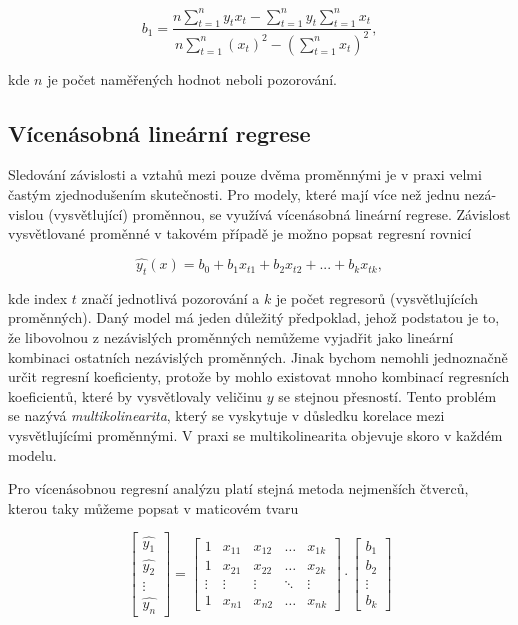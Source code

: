 \documentclass[a4paper,12pt,twoside]{scrreprt}
\begin{document}
\begin{equation}
b_1 = \frac{n\sum_{t=1}^{n}y_tx_t - \sum_{t=1}^{n}y_t\sum_{t=1}^{n}x_t} {n\sum_{t=1}^{n}(x_t)^2 - (\sum_{t=1}^{n}x_t)^2},
\end{equation}

kde $n$ je počet naměřených hodnot neboli pozorování. 

\subsection{Vícenásobná lineární regrese}

Sledování závislosti a vztahů mezi pouze dvěma proměnnými je v praxi velmi častým zjednodušením skutečnosti. Pro modely, které mají více než jednu nezá-vislou (vysvětlující) proměnnou, se využívá vícenásobná lineární regrese. Závislost vysvětlované proměnné v takovém případě je možno popsat regresní rovnicí 

\begin{equation}
\hat{y_t}(x) = b_0 + b_1x_{t1} + b_2x_{t2} + ... + b_kx_{tk},
\end{equation}

kde index $t$ značí jednotlivá pozorování a $k$ je počet regresorů (vysvětlujících proměnných). Daný model má jeden důležitý předpoklad, jehož podstatou je to, že libovolnou z nezávislých proměnných nemůžeme vyjadřit jako lineární kombinaci ostatních nezávislých proměnných. Jinak bychom nemohli jednoznačně určit regresní koeficienty, protože by mohlo existovat mnoho kombinací regresních koeficientů, které by vysvětlovaly veličinu $y$ se stejnou přesností. Tento problém se nazývá \textit{multikolinearita}, který se vyskytuje v důsledku korelace mezi vysvětlujícími proměnnými. V praxi se multikolinearita objevuje skoro v každém modelu.

Pro vícenásobnou regresní analýzu platí stejná metoda nejmenších čtverců, kterou taky můžeme popsat v maticovém tvaru 

$$
\begin{bmatrix}
\hat{y_1} \\
\hat{y_2} \\
\vdots \\
\hat{y_n}
\end{bmatrix}
=
\begin{bmatrix}
1 & x_{11} & x_{12} & \ldots & x_{1k} \\
1 & x_{21} & x_{22} & \ldots & x_{2k} \\
\vdots & \vdots & \vdots & \ddots & \vdots \\
1 & x_{n1} & x_{n2} & \ldots & x_{nk}
\end{bmatrix}
\cdot
\begin{bmatrix}
b_1 \\
b_2 \\
\vdots \\
b_k
\end{bmatrix}
$$
\end{document}
